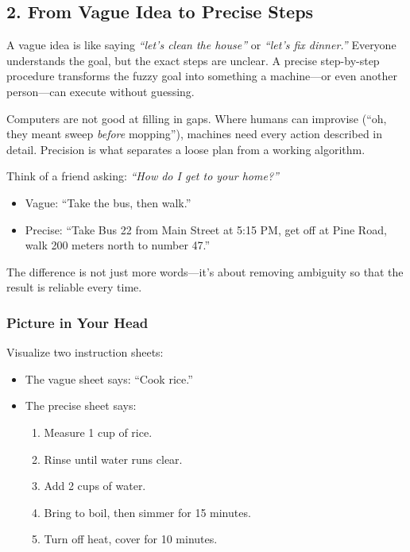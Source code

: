 \documentclass[
  letterpaper,
  DIV=11,
  numbers=noendperiod]{scrreprt}
\providecommand{\tightlist}{%
  \setlength{\itemsep}{0pt}\setlength{\parskip}{0pt}}
\begin{document}
\subsection{2. From Vague Idea to Precise
Steps}\label{from-vague-idea-to-precise-steps}

A vague idea is like saying \emph{``let's clean the house''} or
\emph{``let's fix dinner.''} Everyone understands the goal, but the
exact steps are unclear. A precise step-by-step procedure transforms the
fuzzy goal into something a machine---or even another person---can
execute without guessing.

Computers are not good at filling in gaps. Where humans can improvise
(``oh, they meant sweep \emph{before} mopping''), machines need every
action described in detail. Precision is what separates a loose plan
from a working algorithm.

Think of a friend asking: \emph{``How do I get to your home?''}

\begin{itemize}
\tightlist
\item
  Vague: ``Take the bus, then walk.''
\item
  Precise: ``Take Bus 22 from Main Street at 5:15 PM, get off at Pine
  Road, walk 200 meters north to number 47.''
\end{itemize}

The difference is not just more words---it's about removing ambiguity so
that the result is reliable every time.

\subsubsection{Picture in Your Head}\label{picture-in-your-head-1}

Visualize two instruction sheets:

\begin{itemize}
\item
  The vague sheet says: ``Cook rice.''
\item
  The precise sheet says:

  \begin{enumerate}
  \def\labelenumi{\arabic{enumi}.}
  \tightlist
  \item
    Measure 1 cup of rice.
  \item
    Rinse until water runs clear.
  \item
    Add 2 cups of water.
  \item
    Bring to boil, then simmer for 15 minutes.
  \item
    Turn off heat, cover for 10 minutes.
  \end{enumerate}
\end{itemize}
\end{document}
